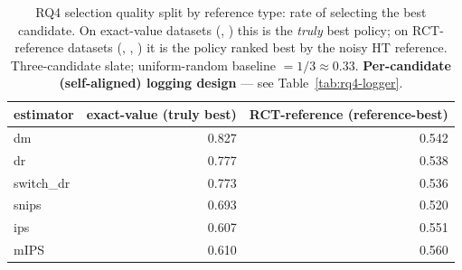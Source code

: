 \begin{table}[t]\centering
\caption{RQ4 selection quality split by reference type: rate of selecting the best candidate. On exact-value datasets (, ) this is the \emph{truly} best policy; on RCT-reference datasets (, , ) it is the policy ranked best by the noisy HT reference. Three-candidate slate; uniform-random baseline $=1/3\approx0.33$. \textbf{Per-candidate (self-aligned) logging design} --- see Table~\ref{tab:rq4-logger}.}
\label{tab:rq4-reftype}
\begin{tabular}{lrr}
\toprule
estimator & exact-value (truly best) & RCT-reference (reference-best) \\
\midrule
dm & 0.827 & 0.542 \\
dr & 0.777 & 0.538 \\
switch\_dr & 0.773 & 0.536 \\
snips & 0.693 & 0.520 \\
ips & 0.607 & 0.551 \\
mIPS & 0.610 & 0.560 \\
\bottomrule
\end{tabular}
\end{table}